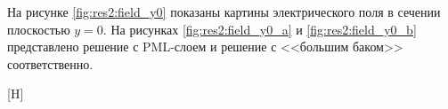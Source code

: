\documentclass[a4paper,14pt]{article}
\makeatletter
\renewenvironment{figure}[1][\fps@figure]{
  \edef\@tempa{\noexpand\@float{figure}[#1]}
  \@tempa
  \addtocounter{foofigure}{1}
}{
  \end@float
}
\renewcommand{\Re}{\mathop{\mathrm{Re}}\nolimits}
\makeatother
\begin{document}
На рисунке \ref{fig:res2:field_y0} показаны картины электрического поля в сечении плоскостью $y=0$. На рисунках \ref{fig:res2:field_y0_a} и \ref{fig:res2:field_y0_b} представлено решение с PML-слоем и решение с <<большим баком>> соответственно.

\begin{figure}[H]
	\centering
	~~
	\caption{$\Re(\mathbf{E}_y)$}
	\label{fig:res2:field_y0}
\end{figure}
\end{document}
